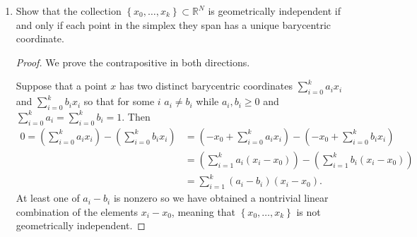 \documentclass[11pt]{article}
\newcommand{\br}[1]{\left(#1\right)}
\newcommand{\cbr}[1]{\left\{#1\right\}}
\DeclareMathOperator{\im}{im}
\begin{document}
\begin{enumerate}
\begin{enumerate}
\begin{proof}
            We require that $\phi_n(m)\in \im\partial_{n+1}^D$ for the map to be well defined. This is indeed true since $\phi$ is a chain map, as $\phi_{n}\circ\partial_{n+1}^C = \partial_{n+1}^D \circ\phi_{n+1}$, and with $m\in  \im\partial_{n+1}^C$, it follows that $\phi_n(m) = \partial_{n+1}^D(\phi_{n+1}(m^\prime))$ for $m^\prime\in C_{n+1}$ satisfying $\partial_{n+1}^C(m^\prime) = m$. Hence $\phi_n(m)\in \im\partial_{n+1}^D$ so that $b+ \im\partial_{n+1}^C\mapsto \phi_n(a)+ \im\partial_{n+1}^D$ and so $\phi_\ast$ is well defined.
        \end{proof}
        \item If two chain maps $\phi,\psi\colon \mathcal{C}\to\mathcal{D}$ are chain homotopic, show that they induce the same homomorphism $H_n(\mathcal{C})\to H_n(\mathcal{D})$ for each $n$. \begin{proof}
            Let $n$ be arbitrary. We show that the difference $(f_\ast-g_\ast)(\overline{b}) = f_\ast(\overline{b})-g_\ast(\overline{b}) = \overline{0}$ for all $\overline{b}\in H_n(\mathcal{C})$. With $b\in \ker\partial_n^C$ we have \begin{align*}
                (f_n-g_n)(b)+ \im\partial_{n+1}^D &= (\partial_{n+1}^D\circ h_n - h_{n-1}\circ\partial_n^C)(b) +\im\partial_{n+1}^D\\
                &= [\partial_{n+1}^D(h_n(b)) - h_{n-1}(\partial_n^C(b))] + \im\partial_{n+1}^D\\
                &= \partial_{n+1}^D(h_n(b)) + \im\partial_{n+1}^D\\
                &= 0 + \im\partial_{n+1}^D
            \end{align*} as desired. It follows that $f_\ast=g_\ast$.
        \end{proof}
    \end{enumerate}
    \item Show that the collection $\cbr{x_0,\dots,x_k}\subset \mathbb{R}^N$ is geometrically independent if and only if each point in the simplex they span has a unique barycentric coordinate. \begin{proof}
        We prove the contrapositive in both directions.

        Suppose that a point $x$ has two distinct barycentric coordinates $\sum_{i=0}^k a_ix_i$ and $\sum_{i=0}^k b_ix_i$ so that for some $i$ $a_i\neq b_i$ while $a_i,b_i\geq 0$ and $\sum_{i=0}^k a_i = \sum_{i=0}^k b_i = 1$. Then \begin{align*}
            0 = \br{\sum_{i=0}^k a_ix_i} - \br{\sum_{i=0}^k b_ix_i} &= \br{- x_0 + \sum_{i=0}^k a_ix_i} - \br{- x_0 + \sum_{i=0}^k b_ix_i}\\
            &= \br{\sum_{i=1}^k a_i(x_i-x_0)} - \br{\sum_{i=1}^k b_i(x_i-x_0)} \\
            &= \sum_{i=1}^k (a_i-b_i)(x_i-x_0).
        \end{align*} At least one of $a_i-b_i$ is nonzero so we have obtained a nontrivial linear combination of the elements $x_i-x_0$, meaning that $\cbr{x_0,\dots,x_k}$ is not geometrically independent.


\end{proof}
\end{enumerate}
\end{document}
